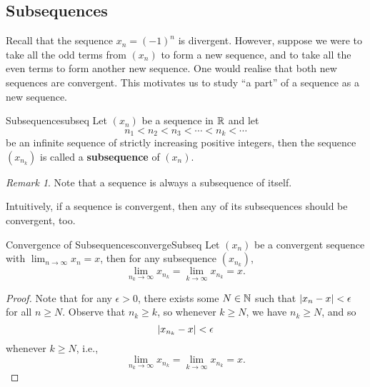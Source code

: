 \documentclass[math]{amznotes}
\theoremstyle{remark}
\newtheorem*{remark}{Remark}
\begin{document}
\subsection{Subsequences}
Recall that the sequence $x_n = (-1)^n$ is divergent. However, suppose we were to take all the odd terms from $(x_n)$ to form a new sequence, and to take all the even terms to form another new sequence. One would realise that both new sequences are convergent. This motivates us to study ``a part'' of a sequence as a new sequence.
\begin{dfnbox}{Subsequence}{subseq}
    Let $(x_n)$ be a sequence in $\mathbb{R}$ and let 
    \begin{displaymath}
        n_1 < n_2 < n_3 < \cdots < n_k < \cdots
    \end{displaymath}
    be an infinite sequence of strictly increasing positive integers, then the sequence $\left(x_{n_k}\right)$ is called a {\color{red} \textbf{subsequence}} of $(x_n)$.
\end{dfnbox}
\begin{notebox}
    \begin{remark}
        Note that a sequence is always a subsequence of itself.
    \end{remark}
\end{notebox}
Intuitively, if a sequence is convergent, then any of its subsequences should be convergent, too.
\begin{thmbox}{Convergence of Subsequences}{convergeSubseq}
    Let $(x_n)$ be a convergent sequence with $\lim_{n \to \infty}x_n = x$, then for any subsequence $(x_{n_k})$,
    \begin{equation*}
        \lim_{n_k \to \infty}x_{n_k} = \lim_{k \to \infty}x_{n_k} = x.
    \end{equation*}
    \tcblower
    \begin{proof}
        Note that for any $\epsilon > 0$, there exists some $N \in \mathbb{N}$ such that ${\left\lvert {x_n - x} \right\rvert} < \epsilon$ for all $n \geq N$. Observe that $n_k \geq k$, so whenever $k \geq N$, we have $n_k \geq N$, and so
        \begin{equation*}
            {\left\lvert {x_{n_k} - x} \right\rvert} < \epsilon
        \end{equation*}
        whenever $k \geq N$, i.e., 
        \begin{equation*}
            \lim_{n_k \to \infty}x_{n_k} = \lim_{k \to \infty}x_{n_k} = x.
        \end{equation*}
    \end{proof}
\end{thmbox}
\end{document}
